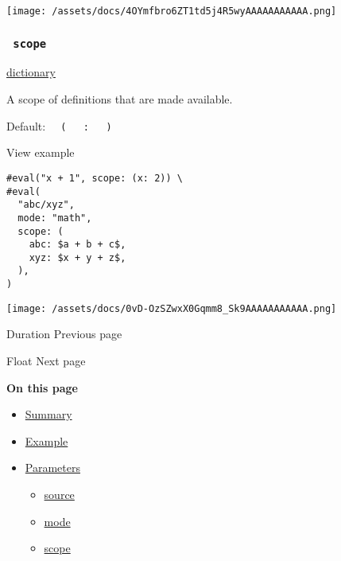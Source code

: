 \texttt{[image: /assets/docs/4OYmfbro6ZT1td5j4R5wyAAAAAAAAAAA.png]}

\subsubsection{\texorpdfstring{\texttt{\ scope\ }}{ scope }}\label{parameters-scope}

\href{/docs/reference/foundations/dictionary/}{dictionary}

A scope of definitions that are made available.

Default:
\texttt{\ }{\texttt{\ (\ }}\texttt{\ }{\texttt{\ :\ }}\texttt{\ }{\texttt{\ )\ }}\texttt{\ }


View example

\begin{verbatim}
#eval("x + 1", scope: (x: 2)) \
#eval(
  "abc/xyz",
  mode: "math",
  scope: (
    abc: $a + b + c$,
    xyz: $x + y + z$,
  ),
)
\end{verbatim}

\texttt{[image: /assets/docs/0vD-OzSZwxX0Gqmm8\_Sk9AAAAAAAAAAA.png]}

\href{/docs/reference/foundations/duration/}{\pandocbounded{}}

{ Duration } { Previous page }

\href{/docs/reference/foundations/float/}{\pandocbounded{}}

{ Float } { Next page }

\textbf{On this page}

\begin{itemize}
\tightlist
\item
  \hyperref[summary]{Summary}
\item
  \hyperref[example]{Example}
\item
  \hyperref[parameters]{Parameters}

  \begin{itemize}
  \tightlist
  \item
    \hyperref[parameters-source]{source}
  \item
    \hyperref[parameters-mode]{mode}
  \item
    \hyperref[parameters-scope]{scope}
  \end{itemize}
\end{itemize}

